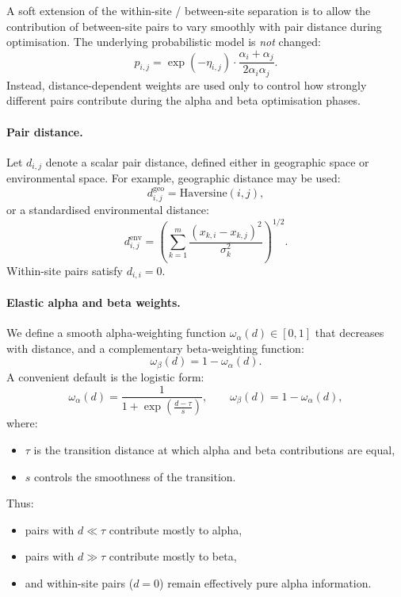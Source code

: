 \documentclass{article}
\begin{document}
A soft extension of the within-site / between-site separation is to allow the contribution of between-site pairs to vary smoothly with pair distance during optimisation. The underlying probabilistic model is \emph{not} changed:
\begin{equation}
    p_{i,j}
    =
    \exp(-\eta_{i,j})
    \cdot
    \frac{\alpha_i + \alpha_j}{2\alpha_i\alpha_j}.
\end{equation}
Instead, distance-dependent weights are used only to control how strongly different pairs contribute during the alpha and beta optimisation phases.

\paragraph{Pair distance.}
Let \(d_{i,j}\) denote a scalar pair distance, defined either in geographic space or environmental space. For example, geographic distance may be used:
\begin{equation}
    d_{i,j}^{\mathrm{geo}} = \mathrm{Haversine}(i,j),
\end{equation}
or a standardised environmental distance:
\begin{equation}
    d_{i,j}^{\mathrm{env}}
    =
    \left(
    \sum_{k=1}^{m}
    \frac{(x_{k,i}-x_{k,j})^2}{\sigma_k^2}
    \right)^{1/2}.
\end{equation}
Within-site pairs satisfy \(d_{i,i}=0\).

\paragraph{Elastic alpha and beta weights.}
We define a smooth alpha-weighting function \(\omega_\alpha(d)\in[0,1]\) that decreases with distance, and a complementary beta-weighting function:
\begin{equation}
    \omega_\beta(d) = 1 - \omega_\alpha(d).
\end{equation}
A convenient default is the logistic form:
\begin{equation}
    \omega_\alpha(d)
    =
    \frac{1}{1 + \exp\!\left(\frac{d-\tau}{s}\right)},
    \qquad
    \omega_\beta(d)
    =
    1 - \omega_\alpha(d),
    \label{eq:elastic-weights}
\end{equation}
where:
\begin{itemize}
    \item \(\tau\) is the transition distance at which alpha and beta contributions are equal,
    \item \(s\) controls the smoothness of the transition.
\end{itemize}
Thus:
\begin{itemize}
    \item pairs with \(d \ll \tau\) contribute mostly to alpha,
    \item pairs with \(d \gg \tau\) contribute mostly to beta,
    \item and within-site pairs (\(d=0\)) remain effectively pure alpha information.
\end{itemize}
\end{document}
